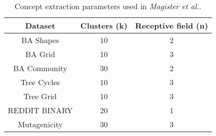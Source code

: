 \begin{table}[h]
    \centering
    \captionsetup{width=.9\textwidth}
    \begin{tabular}{c|cc}
        \textbf{Dataset} &
        \textbf{Clusters (k)} &
        \textbf{Receptive field (n)} \\
        \midrule
        BA Shapes       & 10 & 2 \\
        BA Grid         & 10 & 3 \\
        BA Community    & 30 & 2 \\
        Tree Cycles     & 10 & 3 \\
        Tree Grid       & 10 & 3 \\
        \midrule
        REDDIT BINARY   & 20 & 1 \\
        Mutagenicity    & 30 & 3 \\
    \end{tabular}
    \caption{Concept extraction parameters used in \textit{Magister et al.}\cite{magister2021gcexplainer}.}
    \label{tab:GCN-concept-params}
\end{table}

